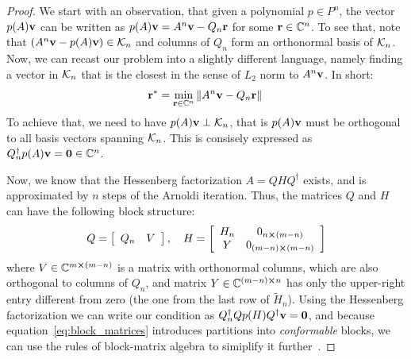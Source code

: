 \begin{proof}
	We start with an observation, that given a polynomial \(p\in P^n\), the vector \(p(A)\vectorbold{v}\)
	can be written as \(p(A)\vectorbold{v} = A^n \vectorbold{v} - Q_n \vectorbold{r}\) for some \(\vectorbold{r}\in \CC^n\).
	To see that, note that \(\left(A^n \vectorbold{v} - p(A)\vectorbold{v}\right) \in \K{n}\) and columns of \(Q_n\) form an
	orthonormal basis of \(\mathcal{K}_{n}\). Now, we can recast our problem into a slightly different language, namely finding a vector
	in \(\mathcal{K}_{n}\) that is the closest in the sense of \(L_2\) norm to \(A^n \vectorbold{v}\). In short:
	\begin{equation*}
		\vectorbold{r}^{\ast} = \min_{\vectorbold{r}\in\CC^n}\norm*{A^n \vectorbold{v} - Q_n \vectorbold{r}}
	\end{equation*}
	To achieve that, we need to have \(p(A)\vectorbold{v}\perp \K{n}\), that is \(p(A)\vectorbold{v}\) must
	be orthogonal to all basis vectors spanning \(\mathcal{K}_{n}\). This is consisely expressed as 
	\(Q^{\dagger}_{n} p(A)\vectorbold{v} = \vectorbold{0}\in \CC^n\).

	Now, we know that the Hessenberg factorization \(A = QHQ^{\dagger}\) exists, and is approximated by \(n\) steps
	of the Arnoldi iteration. Thus, the matrices \(Q\) and \(H\) can have the following block structure:
	\begin{equation}
		Q=\left[\begin{array}{ll}
			Q_n & V
			\end{array}\right],
			\quad H=\left[\begin{array}{cc}
			H_n & 0_{n\cross(m-n)} \\
			Y & 0_{(m-n)\cross(m-n)}
			\end{array}\right]
			\label{eq:block_matrices}
	\end{equation}
	where \(V \in \mathbb{C}^{m\cross(m-n)}\) is a matrix with orthonormal columns, which are also orthogonal to columns of
	\(Q_n\), and matrix \(Y\in\mathbb{C}^{(m-n)\cross n}\) has only the upper-right entry different from zero
	(the one from the last row of \(\tilde{H}_n\)). Using the Hessenberg factorization we can write our condition
	as \(Q_n^{\dagger} Q p(H) Q^{\dagger}\vectorbold{v} = \vectorbold{0}\), and because equation~\eqref{eq:block_matrices}
	introduces partitions into \textit{conformable} blocks, we can use the rules of block-matrix algebra to simiplify
	it further~\autocite{Eves1980}.


\end{proof}
